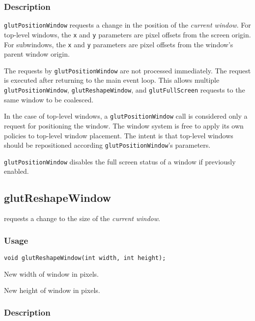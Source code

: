 \subsubsection*{Description}

{\tt glutPositionWindow} requests a change in the position of
the {\em current window}.
For top-level windows, the {\tt x} and {\tt y} parameters are
pixel offsets from the screen origin.  For subwindows, the
{\tt x} and {\tt y} parameters are pixel offsets from the window's
parent window origin.

The requests by {\tt glutPositionWindow} are not processed immediately.
The request is executed after returning to the main event loop.
This allows multiple {\tt glutPositionWindow}, {\tt glutReshapeWindow},
and {\tt glutFullScreen} requests to the same window to be coalesced.

In the case of top-level windows, a {\tt glutPositionWindow} call
is considered only a request for positioning the window.
The window system is free to apply its own policies to top-level
window placement.  The intent is that top-level windows
should be repositioned according {\tt glutPositionWindow}'s parameters.

{\tt glutPositionWindow} disables the full screen status of a window
if previously enabled.

\subsection{glutReshapeWindow}

 requests a change to the size of
the {\em current window}.

\subsubsection*{Usage}
\begin{verbatim}
void glutReshapeWindow(int width, int height);
\end{verbatim}
\begin{description}
\itemsep 0in
\item[{\tt width}]
New width of window in pixels.
\item[{\tt height}]
New height of window in pixels.
\end{description}

\subsubsection*{Description}

